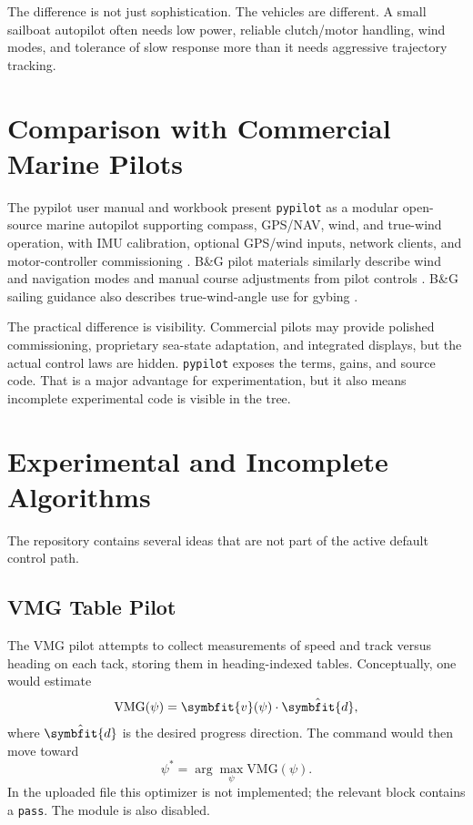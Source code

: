 \documentclass[10pt,twocolumn]{article}
\newcommand{\vct}[1]{\symbfit{#1}}   %
\newcommand{\heading}{\psi}
\begin{document}
The difference is not just sophistication.  The vehicles are different.  A small sailboat
autopilot often needs low power, reliable clutch/motor handling, wind modes, and tolerance
of slow response more than it needs aggressive trajectory tracking.

\section{Comparison with Commercial Marine Pilots}

The pypilot user manual and workbook present \texttt{pypilot} as a modular
open-source marine autopilot supporting compass, GPS/NAV, wind, and true-wind
operation, with IMU calibration, optional GPS/wind inputs, network clients, and
motor-controller commissioning \cite{pypilot-user-manual,pypilot-workbook-wiki}.
B\&G pilot materials similarly describe wind and navigation modes and manual course
adjustments from pilot controls \cite{bg-pilot}.  B\&G sailing guidance also
describes true-wind-angle use for gybing \cite{bg-setup}.

The practical difference is visibility.  Commercial pilots may provide polished
commissioning, proprietary sea-state adaptation, and integrated displays, but the actual
control laws are hidden.  \texttt{pypilot} exposes the terms, gains, and source code.
That is a major advantage for experimentation, but it also means incomplete experimental
code is visible in the tree.

\section{Experimental and Incomplete Algorithms}

The repository contains several ideas that are not part of the active default control path.

\subsection{VMG Table Pilot}

The VMG pilot attempts to collect measurements of speed and track versus heading on each
tack, storing them in heading-indexed tables.  Conceptually, one would estimate
\begin{equation}
  \mathrm{VMG}(\heading) = \vct{v}(\heading)\cdot \hat{\vct{d}},
\end{equation}
where \(\hat{\vct{d}}\) is the desired progress direction.  The command would then move
toward
\begin{equation}
  \heading^* = \arg\max_{\heading} \mathrm{VMG}(\heading).
\end{equation}
In the uploaded file this optimizer is not implemented; the relevant block contains a
\texttt{pass}.  The module is also disabled.
\end{document}
